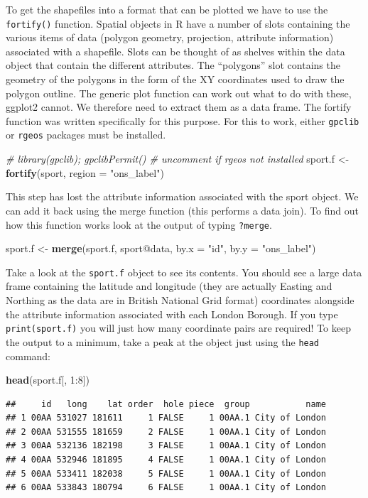 \documentclass[]{article}
\newenvironment{Shaded}{}{}
\newcommand{\KeywordTok}[1]{\textcolor[rgb]{0.00,0.44,0.13}{\textbf{{#1}}}}
\newcommand{\DataTypeTok}[1]{\textcolor[rgb]{0.56,0.13,0.00}{{#1}}}
\newcommand{\DecValTok}[1]{\textcolor[rgb]{0.25,0.63,0.44}{{#1}}}
\newcommand{\StringTok}[1]{\textcolor[rgb]{0.25,0.44,0.63}{{#1}}}
\newcommand{\CommentTok}[1]{\textcolor[rgb]{0.38,0.63,0.69}{\textit{{#1}}}}
\newcommand{\NormalTok}[1]{{#1}}
\begin{document}
To get the shapefiles into a format that can be plotted we have to use
the \texttt{fortify()} function. Spatial objects in R have a number of
slots containing the various items of data (polygon geometry,
projection, attribute information) associated with a shapefile. Slots
can be thought of as shelves within the data object that contain the
different attributes. The ``polygons'' slot contains the geometry of the
polygons in the form of the XY coordinates used to draw the polygon
outline. The generic plot function can work out what to do with these,
ggplot2 cannot. We therefore need to extract them as a data frame. The
fortify function was written specifically for this purpose. For this to
work, either \texttt{gpclib} or \texttt{rgeos} packages must be
installed.

\begin{Shaded}
\begin{Highlighting}[]
\CommentTok{# library(gpclib); gpclibPermit() # uncomment if rgeos not installed}
\NormalTok{sport.f <- }\KeywordTok{fortify}\NormalTok{(sport, }\DataTypeTok{region =} \StringTok{"ons_label"}\NormalTok{)}
\end{Highlighting}
\end{Shaded}
This step has lost the attribute information associated with the sport
object. We can add it back using the merge function (this performs a
data join). To find out how this function works look at the output of
typing \texttt{?merge}.

\begin{Shaded}
\begin{Highlighting}[]
\NormalTok{sport.f <- }\KeywordTok{merge}\NormalTok{(sport.f, sport@data, }\DataTypeTok{by.x =} \StringTok{"id"}\NormalTok{, }\DataTypeTok{by.y =} \StringTok{"ons_label"}\NormalTok{)}
\end{Highlighting}
\end{Shaded}
Take a look at the \texttt{sport.f} object to see its contents. You
should see a large data frame containing the latitude and longitude
(they are actually Easting and Northing as the data are in British
National Grid format) coordinates alongside the attribute information
associated with each London Borough. If you type \texttt{print(sport.f)}
you will just how many coordinate pairs are required! To keep the output
to a minimum, take a peak at the object just using the \texttt{head}
command:

\begin{Shaded}
\begin{Highlighting}[]
\KeywordTok{head}\NormalTok{(sport.f[, }\DecValTok{1}\NormalTok{:}\DecValTok{8}\NormalTok{])}
\end{Highlighting}
\end{Shaded}
\begin{verbatim}
##     id   long    lat order  hole piece  group           name
## 1 00AA 531027 181611     1 FALSE     1 00AA.1 City of London
## 2 00AA 531555 181659     2 FALSE     1 00AA.1 City of London
## 3 00AA 532136 182198     3 FALSE     1 00AA.1 City of London
## 4 00AA 532946 181895     4 FALSE     1 00AA.1 City of London
## 5 00AA 533411 182038     5 FALSE     1 00AA.1 City of London
## 6 00AA 533843 180794     6 FALSE     1 00AA.1 City of London
\end{verbatim}
\end{document}
